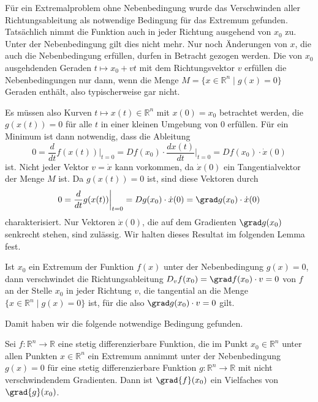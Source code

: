 Für ein Extremalproblem ohne Nebenbedingung wurde das Verschwinden
aller Richtungsableitung als notwendige Bedingung für das
Extremum gefunden.
Tatsächlich nimmt die Funktion auch in jeder Richtung ausgehend
von $x_0$ zu.
Unter der Nebenbedingung gilt dies nicht mehr.
Nur noch Änderungen von $x$, die auch die Nebenbedingung
erfüllen, durfen in Betracht gezogen werden.
Die von $x_0$ ausgehdenden Geraden $t\mapsto x_0+vt$ mit dem
Richtungsvektor $v$ erfüllen die Nebenbedingungen nur dann, wenn
die Menge $M=\{x\in\mathbb{R}^n \mid g(x)=0\}$ Geraden enthält, also
typischerweise gar nicht.

Es müssen also Kurven $t\mapsto x(t)\in\mathbb{R}^n$ mit $x(0)=x_0$
betrachtet werden, die $g(x(t))=0$ für alle $t$ in einer kleinen Umgebung
von $0$ erfüllen.
Für ein Minimum ist dann notwendig, dass die Ableitung
\begin{equation}
0
=
\frac{d}{dt} f(x(t))\bigg|_{t=0}
=
Df(x_0)\cdot \frac{dx(t)}{dt}\bigg|_{t=0}
=
Df(x_0)\cdot \dot{x}(0)
\label{buch:fuvar:nebenbedingungen:eqn:gradf}
\end{equation}
ist.
Nicht jeder Vektor $v=\dot{x}$ kann vorkommen, da $\dot{x}(0)$ ein
Tangentialvektor der Menge $M$ ist.
Da $g(x(t))=0$ ist, sind diese Vektoren durch
\begin{equation}
0
=
\frac{d}{dt}g(x(t))\bigg|_{t=0}
=
Dg(x_0)\cdot \dot{x}(0)
=
\grad g(x_0)\cdot \dot{x}(0)
\label{buch:fuvar:nebenbedingungen:eqn:gradg}
\end{equation}
charakterisiert.
Nur Vektoren $\dot{x}(0)$, die auf dem Gradienten $\grad g(x_0)$ 
senkrecht stehen, sind zulässig.
Wir halten dieses Resultat im folgenden Lemma fest.

\begin{lemma}
\label{buch:fuvar:nebenbedingungen:lemma:nebenbedingungen}
Ist $x_0$ ein Extremum der Funktion $f(x)$ unter der Nebenbedingung
$g(x)=0$, dann verschwindet die Richtungsableitung
\(
D_vf(x_0) = \grad f(x_0)\cdot v = 0
\)
von $f$ an der Stelle $x_0$ in jeder Richtung $v$, die tangential
an die Menge $\{x\in\mathbb{R}^n \mid g(x)=0\}$ ist, für die also
$\grad g(x_0)\cdot v=0$ gilt.
\end{lemma}

Damit haben wir die folgende notwendige Bedingung gefunden.

\begin{satz}
\label{buch:fuvar:nebenbedingungen:satz:nebenbedingung}
Sei $f\colon\mathbb{R}^n\to\mathbb{R}$ eine stetig differenzierbare
Funktion, die im Punkt $x_0\in\mathbb{R}^n$ unter allen Punkten
$x\in\mathbb{R}^n$ ein Extremum annimmt unter der Nebenbedingung
$g(x)=0$ für eine stetig differenzierbare Funktion
$g\colon\mathbb{R}^n\to\mathbb{R}$ mit nicht verschwindendem Gradienten.
Dann ist $\grad{f}(x_0)$ ein Vielfaches von $\grad{g}(x_0)$.
\end{satz}

